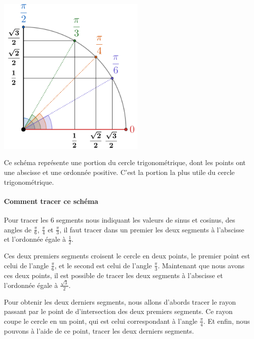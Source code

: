 \documentclass[a4paper]{article}
\begin{document}
			\begin{multicols}{2}

				\begin{center}
					\includegraphics[height=7.8cm]{Image/Cercle Trigo/cercle_trigo_valeur_remarquable.PNG}
				\end{center}

				Ce schéma représente une portion du cercle trigonométrique,
				dont les points ont une abscisse et une ordonnée positive.
				C'est la portion la plus utile du cercle trigonométrique.

				\paragraph*{Comment tracer ce schéma}

				Pour tracer les 6 segments nous indiquant les valeurs de sinus et cosinus,
				des angles de $\frac{\pi}{6}$, $\frac{\pi}{4}$ et $\frac{\pi}{3}$,
				il faut tracer dans un premier les deux segments à l'abscisse et l'ordonnée égale à $\frac{1}{2}$.

				Ces deux premiers segments croisent le cercle en deux points,
				le premier point est celui de l'angle $\frac{\pi}{6}$,
				et le second est celui de l'angle $\frac{\pi}{3}$.
				Maintenant que nous avons ces deux points,
				il est possible de tracer les deux segments à l'abscisse et l'ordonnée égale à $\frac{\sqrt{3}}{2}$.

				\phantom{dhdgdj}

				\phantom{dhdgdj}

			\end{multicols}

			Pour obtenir les deux derniers segments, 
			nous allons d'abords tracer le rayon passant par le point de d'intersection
			des deux premiers segments.
			Ce rayon coupe le cercle en un point,
			qui est celui correspondant à l'angle $\frac{\pi}{4}$.
			Et enfin, nous pouvons à l'aide de ce point,
			tracer les deux derniers segments.
			
\end{document}
